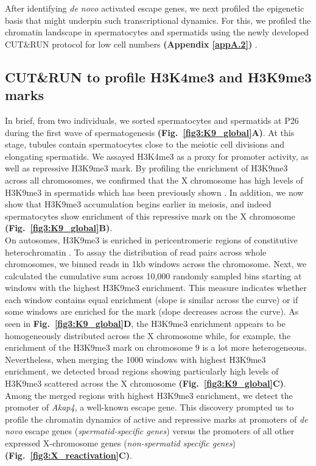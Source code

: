 After identifying \emph{de novo} activated escape genes, we next profiled the epigenetic basis that might underpin such transcriptional dynamics. For this, we profiled the chromatin landscape in spermatocytes and spermatids using the newly developed CUT\&{}RUN protocol for low cell numbers \textbf{(Appendix \ref{appA.2})} \citep{Skene2018}. 

\subsection{CUT\&{}RUN to profile H3K4me3 and H3K9me3 marks}

In brief, from two individuals, we sorted spermatocytes and spermatids at P26 during the first wave of spermatogenesis \textbf{(Fig.~\ref{fig3:K9_global}A)}. At this stage, tubules contain spermatocytes close to the meiotic cell divisions and elongating spermatids. We assayed H3K4me3 as a proxy for promoter activity, as well as repressive H3K9me3 mark. By profiling the enrichment of H3K9me3 across all chromosomes, we confirmed that the X chromosome has high levels of H3K9me3 in spermatids which has been previously shown \citep{Moretti2016, Greaves2006, Tachibana2007}. In addition, we now show that H3K9me3 accumulation begins earlier in meiosis, and indeed spermatocytes show enrichment of this repressive mark on the X chromosome \textbf{(Fig.~\ref{fig3:K9_global}B)}. \\

On autosomes, H3K9me3 is enriched in pericentromeric regions of constitutive heterochromatin \citep{Peters2001}. To assay the distribution of read pairs across whole chromosomes, we binned reads in 1kb windows across the chromosome. Next, we calculated the cumulative sum across 10,000 randomly sampled bins starting at windows with the highest H3K9me3 enrichment. This measure indicates whether each window contains equal enrichment (slope is similar across the curve) or if some windows are enriched for the mark (slope decreases across the curve). As seen in \textbf{Fig.~\ref{fig3:K9_global}D}, the H3K9me3 enrichment appears to be homogeneously distributed across the X chromosome while, for example, the enrichment of the H3K9me3 mark on chromosome 9 is a lot more heterogeneous. \\

Nevertheless, when merging the 1000 windows with highest H3K9me3 enrichment, we detected broad regions showing particularly high levels of H3K9me3 scattered across the X chromosome \textbf{(Fig.~\ref{fig3:K9_global}C)}. Among the merged regions with highest H3K9me3 enrichment, we detect the promoter of \textit{Akap4}, a well-known escape gene. This discovery prompted us to profile the chromatin dynamics of active and repressive marks at promoters of \emph{de novo} escape genes (\emph{spermatid-specific genes}) versus the promoters of all other expressed X-chromosome genes (\emph{non-spermatid specific genes}) \textbf{(Fig.~\ref{fig3:X_reactivation}C)}.

